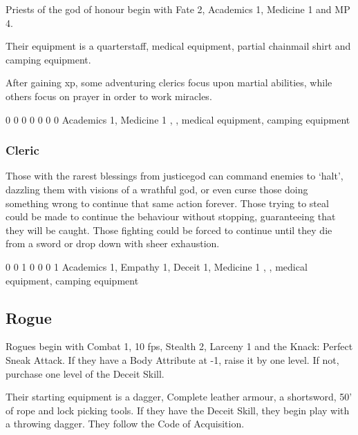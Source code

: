 {\begin{multicols}{2}
Priests of the god of honour begin with Fate 2, Academics 1, Medicine 1 and MP 4.

Their equipment is a quarterstaff, medical equipment, partial chainmail shirt and camping equipment.

After gaining \gls{xp}, some adventuring clerics focus upon martial abilities, while others focus on prayer in order to work miracles.


{0}%
{0}%
{{0}%
{0}%
{0}}%
{0}%
{0}%
{Academics 1, Medicine 1}%
{\quarterstaff, \partialchain, medical equipment, camping equipment}%
{}

\subsubsection{Cleric}

Those with the rarest blessings from \gls{justicegod} can command enemies to `halt', dazzling them with visions of a wrathful god, or even curse those doing something wrong to continue that same action forever.
Those trying to steal could be made to continue the behaviour without stopping, guaranteeing that they will be caught.
Those fighting could be forced to continue until they die from a sword or drop down with sheer exhaustion.


{0}%
{0}%
{{1}%
{0}%
{0}}%
{0}%
{1}%
{Academics 1, Empathy 1, Deceit 1, Medicine 1}%
{\quarterstaff, \partialchain, medical equipment, camping equipment}%
{\addtocounter{fp}{5}}

\subsection{Rogue}

Rogues begin with Combat 1, 10 \glspl{fp}, Stealth 2, Larceny 1 and the Knack: Perfect Sneak Attack.
If they have a Body Attribute at -1, raise it by one level.
If not, purchase one level of the Deceit Skill.

Their starting equipment is a dagger, Complete leather armour, a shortsword, 50' of rope and lock picking tools.
If they have the Deceit Skill, they begin play with a throwing dagger.
They follow the Code of Acquisition.


\end{multicols}}
